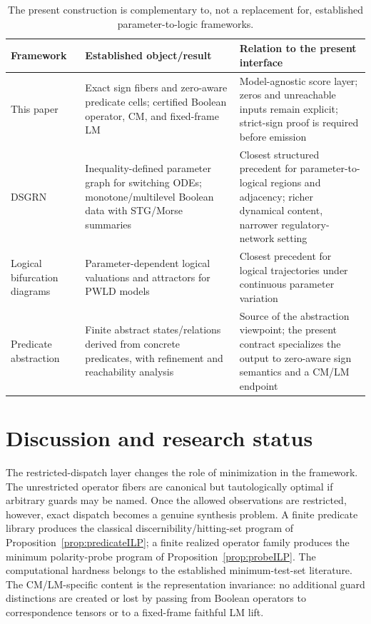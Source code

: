 \documentclass[11pt]{article}
\theoremstyle{definition}
\theoremstyle{remark}
\begin{document}
\begin{table}[t]
\centering
\small
\renewcommand{\arraystretch}{1.2}
\begin{tabularx}{\textwidth}{@{}>{\raggedright\arraybackslash}p{} >{\raggedright\arraybackslash}X >{\raggedright\arraybackslash}X@{}}
\toprule
Framework & Established object/result & Relation to the present interface \\
\midrule
This paper & Exact sign fibers and zero-aware predicate cells; certified Boolean operator, CM, and fixed-frame LM & Model-agnostic score layer; zeros and unreachable inputs remain explicit; strict-sign proof is required before emission \\
DSGRN & Inequality-defined parameter graph for switching ODEs; monotone/multilevel Boolean data with STG/Morse summaries & Closest structured precedent for parameter-to-logical regions and adjacency; richer dynamical content, narrower regulatory-network setting \\
Logical bifurcation diagrams & Parameter-dependent logical valuations and attractors for PWLD models & Closest precedent for logical trajectories under continuous parameter variation \\
Predicate abstraction & Finite abstract states/relations derived from concrete predicates, with refinement and reachability analysis & Source of the abstraction viewpoint; the present contract specializes the output to zero-aware sign semantics and a CM/LM endpoint \\
\bottomrule
\end{tabularx}
\caption{The present construction is complementary to, not a replacement for, established parameter-to-logic frameworks.}
\label{tab:comparison}
\end{table}

\section{Discussion and research status}

The restricted-dispatch layer changes the role of minimization in the framework. The unrestricted operator fibers are canonical but tautologically optimal if arbitrary guards may be named. Once the allowed observations are restricted, however, exact dispatch becomes a genuine synthesis problem. A finite predicate library produces the classical discernibility/hitting-set program of Proposition~\ref{prop:predicateILP}; a finite realized operator family produces the minimum polarity-probe program of Proposition~\ref{prop:probeILP}. The computational hardness belongs to the established minimum-test-set literature. The CM/LM-specific content is the representation invariance: no additional guard distinctions are created or lost by passing from Boolean operators to correspondence tensors or to a fixed-frame faithful LM lift.
\end{document}

